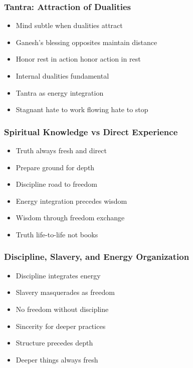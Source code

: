 \begin{frame}[fragile]\frametitle{Tantra: Attraction of Dualities}
  \begin{itemize}
    \item Mind subtle when dualities attract
    \item Ganesh's blessing opposites maintain distance
    \item Honor rest in action honor action in rest
    \item Internal dualities fundamental
    \item Tantra as energy integration
    \item Stagnant hate to work flowing hate to stop
  \end{itemize}
\end{frame}

\begin{frame}[fragile]\frametitle{Spiritual Knowledge vs Direct Experience}
  \begin{itemize}
    \item Truth always fresh and direct
    \item Prepare ground for depth
    \item Discipline road to freedom
    \item Energy integration precedes wisdom
    \item Wisdom through freedom exchange
    \item Truth life-to-life not books
  \end{itemize}
\end{frame}

\begin{frame}[fragile]\frametitle{Discipline, Slavery, and Energy Organization}
  \begin{itemize}
    \item Discipline integrates energy
    \item Slavery masquerades as freedom
    \item No freedom without discipline
    \item Sincerity for deeper practices
    \item Structure precedes depth
    \item Deeper things always fresh
  \end{itemize}
\end{frame}

